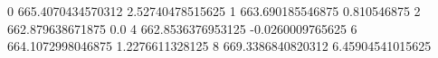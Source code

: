 0 665.4070434570312 2.52740478515625
1 663.690185546875 0.810546875
2 662.879638671875 0.0
4 662.8536376953125 -0.0260009765625
6 664.1072998046875 1.2276611328125
8 669.3386840820312 6.45904541015625
